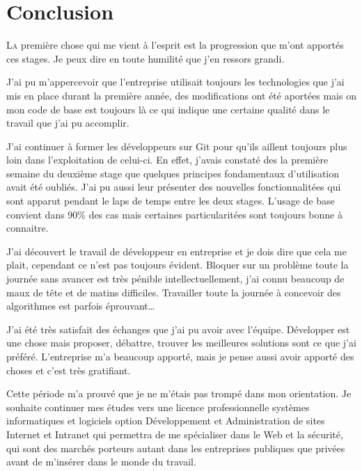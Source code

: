 \chapter{Conclusion} %
\label{cha:Conclusion}

\lettrine{L}{a} première chose qui me vient à l'esprit est la
progression que m'ont apportés ces stages. Je peux dire en toute
humilité que j'en ressors grandi.

J'ai pu m'appercevoir que l'entreprise utilisait toujours les technologies
que j'ai mis en place durant la première année, des modifications ont
été aportées mais on mon code de base est toujours là ce qui indique une
certaine qualité dans le travail que j'ai pu accomplir.

J'ai continuer à former les développeurs sur Git pour qu'ils aillent
toujours plus loin dans l'exploitation de celui-ci. En effet, j'avais
constaté des la première semaine du deuxième stage que quelques
principes fondamentaux d'utilisation avait été oubliés. J'ai pu aussi
leur présenter des nouvelles fonctionnalitées qui sont apparut pendant
le laps de temps entre les deux stages. L'usage de base convient dans
90\%{} des cas mais certaines particularitées sont toujours bonne à
connaitre.

J'ai découvert le travail de développeur en entreprise et je dois dire
que cela me plait, cependant ce n'est pas toujours évident.  Bloquer sur
un problème toute la journée sans avancer est très pénible
intellectuellement, j'ai connu beaucoup de maux de tête et de matins
difficiles. Travailler toute la journée à concevoir des algorithmes est
parfois éprouvant\dots

J'ai été très satisfait des échanges que j'ai pu avoir avec l'équipe.
Développer est une chose mais proposer, débattre, trouver les meilleures
solutions sont ce que j'ai préféré. L'entreprise m'a beaucoup apporté,
mais je pense aussi avoir apporté des choses et c'est très gratifiant.

Cette période m'a prouvé que je ne m'étais pas trompé dans mon
orientation. Je souhaite continuer mes études vers une licence
professionnelle systèmes informatiques et logiciels option \og
Développement et Administration de sites Internet et Intranet \fg{} qui
permettra de me spécialiser dans le Web et la sécurité, qui sont des
marchés porteurs autant dans les entreprises publiques que privées avant
de m'insérer dans le monde du travail.
